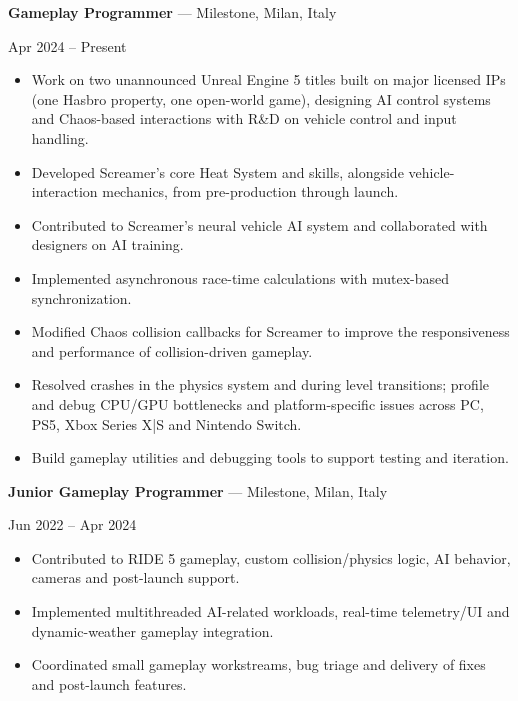 \documentclass[10pt,a4paper]{article}
\newcommand{\role}[3]{
    \needspace{4\baselineskip}
    \textbf{#1} --- #2\par
    {\small #3}\par
}
\begin{document}
\role{Gameplay Programmer}
     {Milestone, Milan, Italy}
     {Apr 2024 -- Present}

\begin{itemize}
    \item Work on two unannounced Unreal Engine 5 titles built on
    major licensed IPs (one Hasbro property, one open-world game),
    designing AI control systems and Chaos-based interactions
    with R\&D on vehicle control and input handling.

    \item Developed Screamer's core Heat System and skills,
    alongside vehicle-interaction mechanics,
    from pre-production through launch.

    \item Contributed to Screamer's neural vehicle AI system
    and collaborated with designers on AI training.

    \item Implemented asynchronous race-time calculations
    with mutex-based synchronization.

    \item Modified Chaos collision callbacks for Screamer
    to improve the responsiveness and performance
    of collision-driven gameplay.

    \item Resolved crashes in the physics system and during
    level transitions; profile and debug CPU/GPU bottlenecks
    and platform-specific issues across PC, PS5,
    Xbox Series X|S and Nintendo Switch.

    \item Build gameplay utilities and debugging tools
    to support testing and iteration.
\end{itemize}

\vspace{3pt}

\role{Junior Gameplay Programmer}
     {Milestone, Milan, Italy}
     {Jun 2022 -- Apr 2024}

\begin{itemize}
    \item Contributed to RIDE 5 gameplay, custom collision/physics
    logic, AI behavior, cameras and post-launch support.

    \item Implemented multithreaded AI-related workloads,
    real-time telemetry/UI and dynamic-weather gameplay integration.

    \item Coordinated small gameplay workstreams, bug triage
    and delivery of fixes and post-launch features.
\end{itemize}
\end{document}
